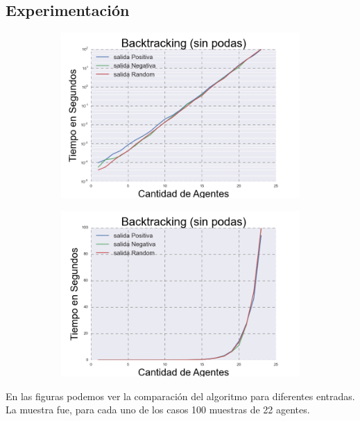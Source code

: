 \subsection{Experimentación} 

\begin{figure}[h]

\begin{subfigure}{0.5\textwidth}
\includegraphics[scale=0.45]{BacktrackingLog.png}
\end{subfigure}
\begin{subfigure}{0.5\textwidth}
\includegraphics[scale=0.45]{Backtracking.png}
\end{subfigure}

\end{figure}

	En las figuras podemos ver la comparación del algoritmo para diferentes entradas. La muestra fue, para cada uno de los casos 100 muestras de 22 agentes.



